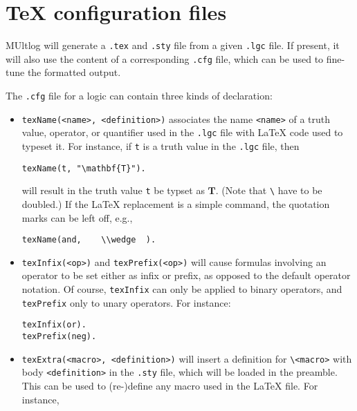 \documentclass[]{article}
\begin{document}
\hypertarget{tex-configuration-files}{%
\section{TeX configuration files}\label{tex-configuration-files}}

MUltlog will generate a \texttt{.tex} and \texttt{.sty} file from a
given \texttt{.lgc} file. If present, it will also use the content of a
corresponding \texttt{.cfg} file, which can be used to fine-tune the
formatted output.

The \texttt{.cfg} file for a logic can contain three kinds of
declaration:

\begin{itemize}
\item
  \texttt{texName(\textless{}name\textgreater{},\ \textless{}definition\textgreater{})}
  associates the name \texttt{\textless{}name\textgreater{}} of a truth
  value, operator, or quantifier used in the \texttt{.lgc} file with
  LaTeX code used to typeset it. For instance, if \texttt{t} is a truth
  value in the \texttt{.lgc} file, then

\begin{verbatim}
texName(t, "\mathbf{T}").
\end{verbatim}

  will result in the truth value \texttt{t} be typset as \(\mathbf{T}\).
  (Note that \texttt{\textbackslash{}} have to be doubled.) If the LaTeX
  replacement is a simple command, the quotation marks can be left off,
  e.g.,

\begin{verbatim}
texName(and,    \\wedge  ).
\end{verbatim}
\item
  \texttt{texInfix(\textless{}op\textgreater{})} and
  \texttt{texPrefix(\textless{}op\textgreater{})} will cause formulas
  involving an operator to be set either as infix or prefix, as opposed
  to the default operator notation. Of course, \texttt{texInfix} can
  only be applied to binary operators, and \texttt{texPrefix} only to
  unary operators. For instance:

\begin{verbatim}
texInfix(or).
texPrefix(neg).
\end{verbatim}
\item
  \texttt{texExtra(\textless{}macro\textgreater{},\ \textless{}definition\textgreater{})}
  will insert a definition for
  \texttt{\textbackslash{}\textless{}macro\textgreater{}} with body
  \texttt{\textless{}definition\textgreater{}} in the \texttt{.sty}
  file, which will be loaded in the preamble. This can be used to
  (re-)define any macro used in the LaTeX file. For instance,


\end{itemize}
\end{document}
